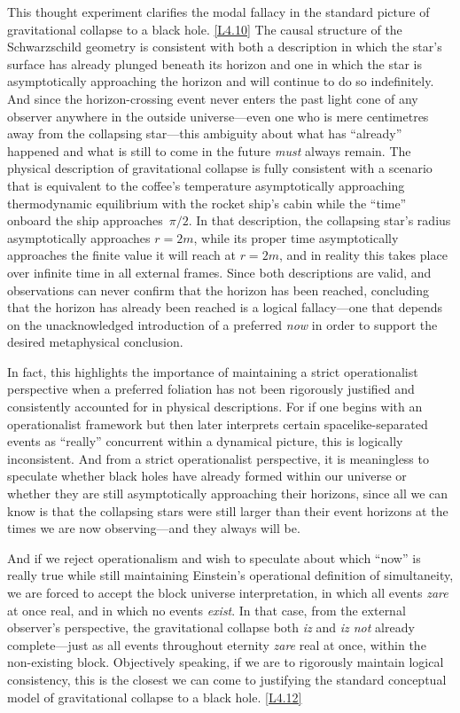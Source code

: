 \documentclass[12pt]{book}
\newcounter{logicanchor}
\newenvironment{logicanchorenv}[1]{\refstepcounter{logicanchor}\label{#1}}{}
\newcommand{\logiclink}[2]{\begin{logicanchorenv}{logic:#1}\end{logicanchorenv}\hyperref[appendix:#1]{[#1]}\xspace}
\begin{document}
This thought experiment clarifies the modal fallacy in the standard picture of gravitational collapse to a black hole. \logiclink{L4.10}{} The causal structure of the Schwarzschild geometry is consistent with both a description in which the star's surface has already plunged beneath its horizon and one in which the star is asymptotically approaching the horizon and will continue to do so indefinitely. And since the horizon-crossing event never enters the past light cone of any observer anywhere in the outside universe---even one who is mere centimetres away from the collapsing star---this ambiguity about what has ``already'' happened and what is still to come in the future \textit{must} always remain. The physical description of gravitational collapse is fully consistent with a scenario that is equivalent to the coffee's temperature asymptotically approaching thermodynamic equilibrium with the rocket ship's cabin while the ``time'' onboard the ship approaches~$\pi/2$. In that description, the collapsing star's radius asymptotically approaches $r=2m$, while its proper time asymptotically approaches the finite value it will reach at $r=2m$, and in reality this takes place over infinite time in all external frames. Since both descriptions are valid, and observations can never confirm that the horizon has been reached, concluding that the horizon has already been reached is a logical fallacy---one that depends on the unacknowledged introduction of a preferred \textit{now} in order to support the desired metaphysical conclusion.

In fact, this highlights the importance of maintaining a strict operationalist perspective when a preferred foliation has not been rigorously justified and consistently accounted for in physical descriptions. For if one begins with an operationalist framework but then later interprets certain spacelike-separated events as ``really'' concurrent within a dynamical picture, this is logically inconsistent. And from a strict operationalist perspective, it is meaningless to speculate whether black holes have already formed within our universe or whether they are still asymptotically approaching their horizons, since all we can know is that the collapsing stars were still larger than their event horizons at the times we are now observing---and they always will be.

And if we reject operationalism and wish to speculate about which ``now'' is really true while still maintaining Einstein's operational definition of simultaneity, we are forced to accept the block universe interpretation, in which all events \textit{zare} at once real, and in which no events \textit{exist}. In that case, from the external observer's perspective, the gravitational collapse both \textit{iz} and \textit{iz not} already complete---just as all events throughout eternity \textit{zare} real at once, within the non-existing block. Objectively speaking, if we are to rigorously maintain logical consistency, this is the closest we can come to justifying the standard conceptual model of gravitational collapse to a black hole. \logiclink{L4.12}{}
\end{document}
